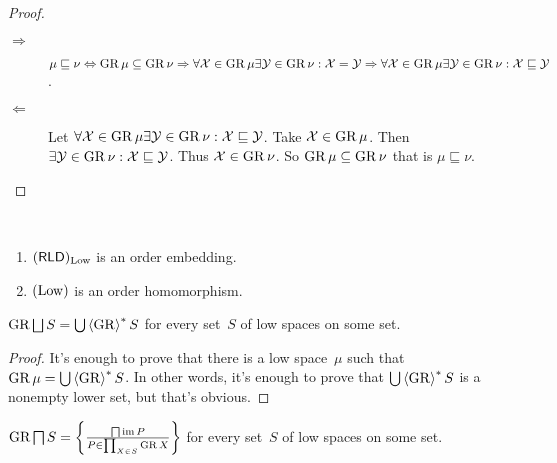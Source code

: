 \begin{proof}
~
\begin{description}
\item[$\Rightarrow$] $\mu \sqsubseteq \nu \Leftrightarrow \operatorname{GR}\mu\subseteq\operatorname{GR}\nu \Rightarrow
  \forall \mathcal{X}\in\operatorname{GR}\mu \exists\mathcal{Y}\in\operatorname{GR}\nu: \mathcal{X}=\mathcal{Y} \Rightarrow
  \forall \mathcal{X}\in\operatorname{GR}\mu \exists\mathcal{Y}\in\operatorname{GR}\nu: \mathcal{X}\sqsubseteq\mathcal{Y}$.
\item[$\Leftarrow$] Let $\forall \mathcal{X}\in\operatorname{GR}\mu \exists\mathcal{Y}\in\operatorname{GR}\nu: \mathcal{X}\sqsubseteq\mathcal{Y}$.
  Take $\mathcal{X}\in\operatorname{GR}\mu$. Then $\exists\mathcal{Y}\in\operatorname{GR}\nu: \mathcal{X}\sqsubseteq\mathcal{Y}$. Thus $\mathcal{X}\in\operatorname{GR}\nu$.
  So $\operatorname{GR}\mu\subseteq\operatorname{GR}\nu$ that is $\mu \sqsubseteq \nu$.
\end{description}
\end{proof}

\begin{obvious}
~
\begin{enumerate}
\item $(\mathsf{RLD})_{\operatorname{Low}}$ is an order embedding.
\item $(\operatorname{Low})$ is an order homomorphism.
\end{enumerate}
\end{obvious}

\begin{prop}
$\GR\bigsqcup S=\bigcup\rsupfun{\GR}S$ for every set~$S$ of low spaces on some set.
\end{prop}

\begin{proof}
It's enough to prove that there is a low space~$\mu$ such that $\operatorname{GR}\mu=\bigcup\left\langle \operatorname{GR}\right\rangle ^{\ast}S$. In other words, it's enough to prove
that $\bigcup\left\langle \operatorname{GR}\right\rangle ^{\ast}S$ is a nonempty lower set, but that's obvious. 
\end{proof}

\begin{prop}
$\operatorname{GR}\bigsqcap S=\left\{ \frac{\bigsqcap\operatorname{im} P}{P\in\prod_{X\in S}\operatorname{GR} X}\right\}$ for every set~$S$ of low spaces on some set.
\end{prop}

